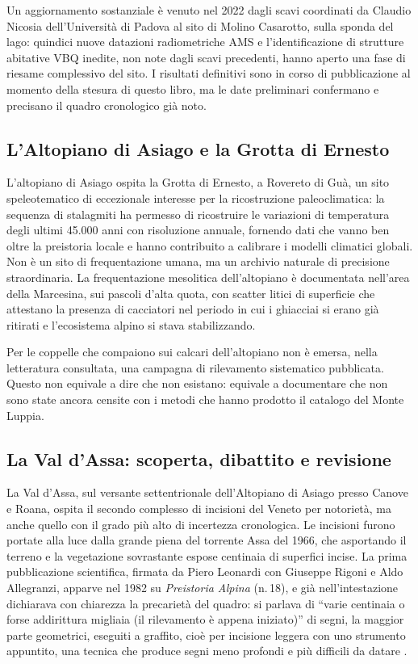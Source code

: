 Un aggiornamento sostanziale è venuto nel 2022 dagli scavi coordinati da Claudio Nicosia dell'Università di Padova al sito di Molino Casarotto, sulla sponda del lago: quindici nuove datazioni radiometriche AMS e l'identificazione di strutture abitative VBQ inedite, non note dagli scavi precedenti, hanno aperto una fase di riesame complessivo del sito. I risultati definitivi sono in corso di pubblicazione al momento della stesura di questo libro, ma le date preliminari confermano e precisano il quadro cronologico già noto.

\subsection{L'Altopiano di Asiago e la Grotta di Ernesto}

L'altopiano di Asiago ospita la Grotta di Ernesto, a Rovereto di Guà, un sito speleotematico di eccezionale interesse per la ricostruzione paleoclimatica: la sequenza di stalagmiti ha permesso di ricostruire le variazioni di temperatura degli ultimi 45.000 anni con risoluzione annuale, fornendo dati che vanno ben oltre la preistoria locale e hanno contribuito a calibrare i modelli climatici globali. Non è un sito di frequentazione umana, ma un archivio naturale di precisione straordinaria. La frequentazione mesolitica dell'altopiano è documentata nell'area della Marcesina, sui pascoli d'alta quota, con scatter litici di superficie che attestano la presenza di cacciatori nel periodo in cui i ghiacciai si erano già ritirati e l'ecosistema alpino si stava stabilizzando.

Per le coppelle che compaiono sui calcari dell'altopiano non è emersa, nella letteratura consultata, una campagna di rilevamento sistematico pubblicata. Questo non equivale a dire che non esistano: equivale a documentare che non sono state ancora censite con i metodi che hanno prodotto il catalogo del Monte Luppia.

\subsection{La Val d'Assa: scoperta, dibattito e revisione}

La Val d'Assa, sul versante settentrionale dell'Altopiano di Asiago presso Canove e Roana, ospita il secondo complesso di incisioni del Veneto per notorietà, ma anche quello con il grado più alto di incertezza cronologica. Le incisioni furono portate alla luce dalla grande piena del torrente Assa del 1966, che asportando il terreno e la vegetazione sovrastante espose centinaia di superfici incise. La prima pubblicazione scientifica, firmata da Piero Leonardi con Giuseppe Rigoni e Aldo Allegranzi, apparve nel 1982 su \emph{Preistoria Alpina} (n.\,18), e già nell'intestazione dichiarava con chiarezza la precarietà del quadro: si parlava di ``varie centinaia o forse addirittura migliaia (il rilevamento è appena iniziato)'' di segni, la maggior parte geometrici, eseguiti a graffito, cioè per incisione leggera con uno strumento appuntito, una tecnica che produce segni meno profondi e più difficili da datare \citep{leonardi1982}.

